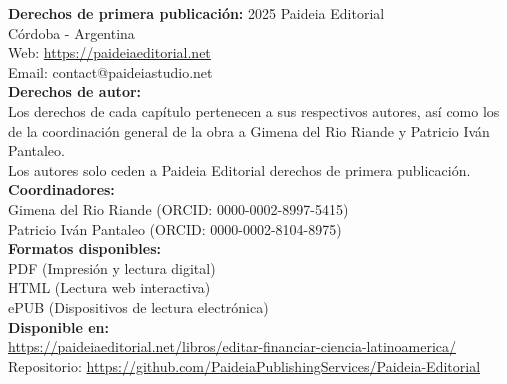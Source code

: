 \noindent\textbf{Derechos de primera publicación:} 2025 \quad Paideia Editorial\\
Córdoba - Argentina\\
Web: \url{https://paideiaeditorial.net}\\
Email: contact@paideiastudio.net\\[1em]

\noindent\textbf{Derechos de autor:}\\
Los derechos de cada capítulo pertenecen a sus respectivos autores, así como los de la coordinación general de la obra a Gimena del Rio Riande y Patricio Iván Pantaleo.\\
Los autores solo ceden a Paideia Editorial derechos de primera publicación.\\[1em]

\noindent\textbf{Coordinadores:}\\
Gimena del Rio Riande (ORCID: 0000-0002-8997-5415)\\
Patricio Iván Pantaleo (ORCID: 0000-0002-8104-8975)\\[1em]

\noindent\textbf{Formatos disponibles:}\\
PDF (Impresión y lectura digital)\\
HTML (Lectura web interactiva)\\
ePUB (Dispositivos de lectura electrónica)\\[1em]

\noindent\textbf{Disponible en:}\\
\url{https://paideiaeditorial.net/libros/editar-financiar-ciencia-latinoamerica/}\\
Repositorio: \url{https://github.com/PaideiaPublishingServices/Paideia-Editorial}\\[1em]

